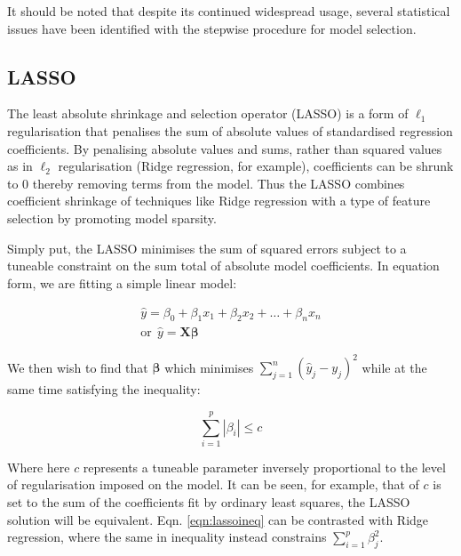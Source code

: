 \documentclass[a4paper,11pt,oneside]{book}
\begin{document}
It should be noted that despite its continued widespread usage, several statistical issues have been identified with the stepwise procedure for model selection.\cite{Hurvich1990, Whittingham2006}

\subsection{LASSO}\label{meth:lasso}

The least absolute shrinkage and selection operator (LASSO) is a form of $\ell_1$ regularisation that penalises the sum of absolute values of standardised regression coefficients. By penalising absolute values and sums, rather than squared values as in $\ell_2$ regularisation (Ridge regression, for example), coefficients can be shrunk to $0$ thereby removing terms from the model. Thus the LASSO combines coefficient shrinkage of techniques like Ridge regression with a type of feature selection by promoting model sparsity.\cite{Tibshirani1994, Hastie2001}

Simply put, the LASSO minimises the sum of squared errors subject to a tuneable constraint on the sum total of absolute model coefficients. In equation form, we are fitting a simple linear model:

\begin{equation}
\begin{aligned}
\hat{y} = \beta_0 + \beta_1 x_1 + \beta_2 x_2 + \ldots + \beta_n x_n\\
\mathrm{or}~~\hat{y} = \bm{X}\bm{\beta} %
\end{aligned}
\end{equation} \vspace{.2em}

We then wish to find that $\bm{\beta}$ which minimises $\sum_{j=1}^{n}(\hat{y}_j - y_j)^2$ while at the same time satisfying the inequality:

\begin{equation}\label{eqn:lassoineq}
\sum\limits_{i=1}^{p} |\beta_i| \leq c
\end{equation} \vspace{.2em}

Where here $c$ represents a tuneable parameter inversely proportional to the level of regularisation imposed on the model. It can be seen, for example, that of $c$ is set to the sum of the coefficients fit by ordinary least squares, the LASSO solution will be equivalent. Eqn. \ref{eqn:lassoineq} can be contrasted with Ridge regression, where the same in inequality instead constrains $\sum_{i=1}^{p} \beta_j^2$.
\end{document}
